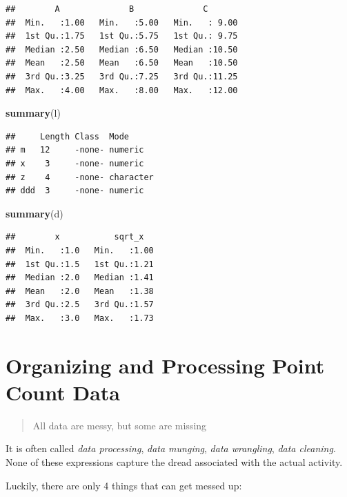 \documentclass[12pt,]{book}
\newenvironment{Shaded}{\begin{snugshade}}{\end{snugshade}}
\newcommand{\KeywordTok}[1]{\textcolor[rgb]{0.13,0.29,0.53}{\textbf{#1}}}
\newcommand{\NormalTok}[1]{#1}
\begin{document}
\begin{verbatim}
##        A              B              C        
##  Min.   :1.00   Min.   :5.00   Min.   : 9.00  
##  1st Qu.:1.75   1st Qu.:5.75   1st Qu.: 9.75  
##  Median :2.50   Median :6.50   Median :10.50  
##  Mean   :2.50   Mean   :6.50   Mean   :10.50  
##  3rd Qu.:3.25   3rd Qu.:7.25   3rd Qu.:11.25  
##  Max.   :4.00   Max.   :8.00   Max.   :12.00
\end{verbatim}

\begin{Shaded}
\begin{Highlighting}[]
\KeywordTok{summary}\NormalTok{(l)}
\end{Highlighting}
\end{Shaded}

\begin{verbatim}
##     Length Class  Mode     
## m   12     -none- numeric  
## x    3     -none- numeric  
## z    4     -none- character
## ddd  3     -none- numeric
\end{verbatim}

\begin{Shaded}
\begin{Highlighting}[]
\KeywordTok{summary}\NormalTok{(d)}
\end{Highlighting}
\end{Shaded}

\begin{verbatim}
##        x           sqrt_x    
##  Min.   :1.0   Min.   :1.00  
##  1st Qu.:1.5   1st Qu.:1.21  
##  Median :2.0   Median :1.41  
##  Mean   :2.0   Mean   :1.38  
##  3rd Qu.:2.5   3rd Qu.:1.57  
##  Max.   :3.0   Max.   :1.73
\end{verbatim}

\hypertarget{pcdata}{%
\chapter{Organizing and Processing Point Count Data}\label{pcdata}}

\begin{quote}
All data are messy, but some are missing
\end{quote}

It is often called \emph{data processing}, \emph{data munging},
\emph{data wrangling}, \emph{data cleaning}.
None of these expressions capture the dread associated with the actual activity.

Luckily, there are only 4 things that can get messed up:
\end{document}
